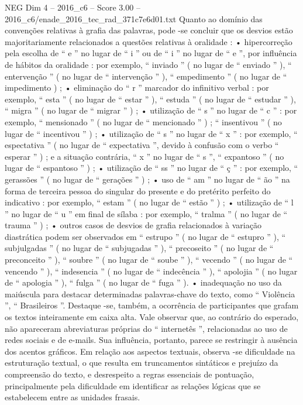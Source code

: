 \begin{textsample}{NEG Dim 4 – 2016\_c6 – Score 3.00 – 2016\_c6/enade\_2016\_tec\_rad\_371c7e6d01.txt}
Quanto ao domínio das convenções relativas à grafia das palavras, pode -se concluir que os desvios estão majoritariamente relacionados a questões relativas à oralidade : • hipercorreção pela escolha de “ e ” no lugar de “ i ” ou de “ i ” no lugar de “ e ”, por influência de hábitos da oralidade : por exemplo, “ inviado ” ( no lugar de “ enviado ” ), “ entervenção ” ( no lugar de “ intervenção ” ), “ empedimento ” ( no lugar de “ impedimento ) ; • eliminação do “ r ” marcador do infinitivo verbal : por exemplo, “ esta ” ( no lugar de “ estar ” ), “ estuda ” ( no lugar de “ estudar ” ), “ migra ” ( no lugar de “ migrar ” ) ; • utilização de “ s ” no lugar de “ c ” : por exemplo, “ mensionado ” ( no lugar de “ mencionado ” ) ; “ insentivou ” ( no lugar de “ incentivou ” ) ; • utilização de “ s ” no lugar de “ x ” : por exemplo, “ espectativa ” ( no lugar de “ expectativa ”, devido à confusão com o verbo “ esperar ” ) ; e a situação contrária, “ x ” no lugar de “ s ”, “ expantoso ” ( no lugar de “ espantoso ” ) ; • utilização de “ ss ” no lugar de “ ç ” : por exemplo, “ gerassões ” ( no lugar de “ gerações ” ) ; • uso de “ am ” no lugar de “ ão ” na forma de terceira pessoa do singular do presente e do pretérito perfeito do indicativo : por exemplo, “ estam ” ( no lugar de “ estão ” ) ; • utilização de “ l ” no lugar de “ u ” em final de sílaba : por exemplo, “ tralma ” ( no lugar de “ trauma ” ) ; • outros casos de desvios de grafia relacionados à variação diastrática podem ser observados em “ estrupo ” ( no lugar de “ estupro ” ), “ subjulgadas ” ( no lugar de “ subjugadas ” ), “ precoseito ” ( no lugar de “ preconceito ” ), “ soubre ” ( no lugar de “ soube ” ), “ vecendo ” ( no lugar de “ vencendo ” ), “ indesencia ” ( no lugar de “ indecência ” ), “ apolojia ” ( no lugar de “ apologia ” ), “ fulga ” ( no lugar de “ fuga ” ). • inadequação no uso da maiúscula para destacar determinadas palavras-chave do texto, como “ Violência ”, “ Brasileiros ”.
Destaque -se, também, a ocorrência de participantes que grafam os textos inteiramente em caixa alta.
Vale observar que, ao contrário do esperado, não apareceram abreviaturas próprias do “ internetês ”, relacionadas ao uso de redes sociais e de e-mails.
Sua influência, portanto, parece se restringir à ausência dos acentos gráficos.
Em relação aos aspectos textuais, observa -se dificuldade na estruturação textual, o que resulta em truncamentos sintáticos e prejuízo da compreensão do texto, e desrespeito a regras essenciais de pontuação, principalmente pela dificuldade em identificar as relações lógicas que se estabelecem entre as unidades frasais.

\end{textsample}

